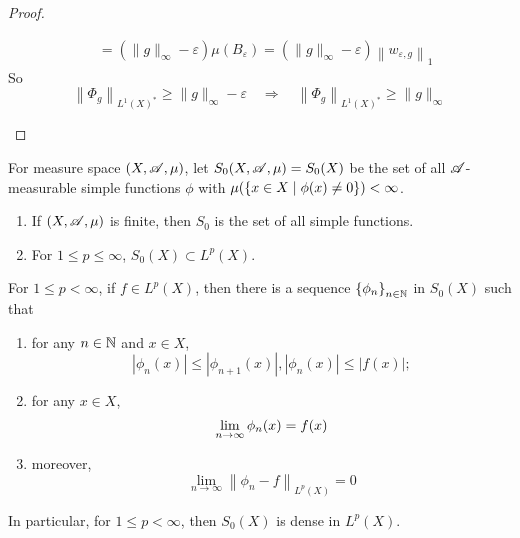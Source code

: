\begin{proof}
\begin{enumerate}[label=(\roman*)]
\begin{equation*}
\begin{aligned}
				& =\left(\|g\|_{\infty}-\varepsilon\right) \mu\left(B_{\varepsilon}\right)=\left(\|g\|_{\infty}-\varepsilon\right)\left\|w_{\varepsilon, g}\right\|_{1}
			\end{aligned}
		\end{equation*}
		So
		\begin{equation*}
			\left\|\Phi_g\right\|_{L^1(X)^*} \geq\|g\|_{\infty}-\varepsilon \quad \Rightarrow \quad \left\|\Phi_g\right\|_{L^1(X)^*} \geq\|g\|_{\infty}
		\end{equation*}
	\end{enumerate}
\end{proof}

\begin{defn}
	For measure space $(X,\mathscr{A},\mu)$, let $S_0(X,\mathscr{A},\mu) = S_0(X)$ be the set of all $\mathscr{A}$-measurable simple functions $\phi$ with $\mu(\left\{x \in X \mid \phi(x)\neq 0\right\}) < \infty$.
\end{defn}
\begin{rmk}
	\begin{enumerate}[label=(\arabic*)]
		\item If $(X,\mathscr{A},\mu)$ is finite, then $S_0$ is the set of all simple functions.
		\item For $1 \leq p \leq \infty$, $S_0(X) \subset L^p(X)$.
	\end{enumerate}
\end{rmk}

\begin{prop}\label{prop:s0dense}
	For $1 \leq p < \infty$, if $f \in L^p(X)$, then there is a sequence $\left\{\phi_n\right\}_{n \in \mathbb{N}}$ in $S_0(X)$ such that
	\begin{enumerate}[label=(\arabic{*})]
		\item for any $n \in \mathbb{N}$ and $x \in X$,
		\begin{equation*}
			\left|\phi_n(x)\right| \leq\left|\phi_{n+1}(x)\right|,\left|\phi_n(x)\right| \leq|f(x)|;
		\end{equation*}
		\item for any $x \in X$, 
		\begin{equation*}
			\lim_{n \rightarrow \infty} \phi_n(x) = f(x)
		\end{equation*}
		\item moreover,
		\begin{equation*}
			\lim _{n \rightarrow \infty}\left\|\phi_n-f\right\|_{L^p(X)}=0
		\end{equation*}
	\end{enumerate}
	In particular, for $1 \leq p < \infty$, then $S_0(X)$ is dense in $L^p(X)$.
\end{prop}

